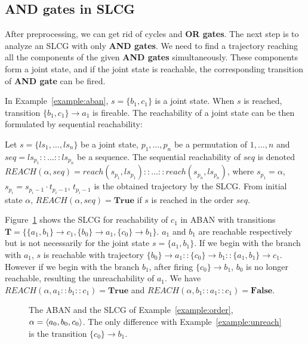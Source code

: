\documentclass[runningheads]{llncs}
\newcommand{\acm}[3]{\{#1\}\rightarrow#3}
\newcommand{\ac}[3]{$\{#1\}\rightarrow#3$}
\DeclarePairedDelimiter{\init}{\langle}{\rangle}
\begin{document}
\subsection{AND gates in SLCG}\label{sectAndGates}
After preprocessing, we can get rid of cycles and \textbf{OR gates}.
The next step is to analyze an SLCG with only \textbf{AND gates}.
We need to find a trajectory reaching all the components of the given \textbf{AND gates} simultaneously.
These components form a joint state, and if the joint state is reachable, the corresponding transition of \textbf{AND gate} can be fired. 

In Example~\ref{example:aban}, $s=\{ b_1,c_1\}$ is a joint state.
When $s$ is reached, transition \ac{b_1,c_1}{a_0}{a_1} is fireable.
The reachability of a joint state can be then formulated by sequential reachability:
\begin{definition}
Let $s=\{ls_1,\ldots,ls_n\}$ be a joint state, $p_1,\ldots ,p_n$ be a permutation of $1,\ldots ,n$ and $seq=ls_{p_1}::\ldots::ls_{p_n}$ be a sequence.
The sequential reachability of $seq$ is denoted %
$REACH(\alpha,seq)=reach(s_{p_1},ls_{p_1})::\ldots::reach(s_{p_n},ls_{p_n})$, where $s_{p_1}=\alpha$, $s_{p_i}=s_{p_i-1}\cdot t_{p_i-1}$, $t_{p_i-1}$ is the obtained trajectory by the SLCG.
From initial state $\alpha$, $REACH(\alpha,seq)=\mathbf{True}$ if $s$ is reached in the order $seq$.
\end{definition}

\begin{example}\label{example:order}
Figure~\ref{fig:5} shows the SLCG for reachability of $c_1$ in ABAN with transitions $\mathbf{T}=\{\acm{a_1,b_1}{c_0}{c_1},\acm{b_0}{a_0}{a_1},\acm{c_0}{b_0}{b_1}\}$.
$a_1$ and $b_1$ are reachable respectively but is not necessarily for the joint state $s=\{a_1,b_1\}$.
If we begin with the branch with $a_1$, $s$ is reachable with trajectory $\acm{b_0}{a_0}{a_1}::\acm{c_0}{b_0}{b_1}::\acm{a_1,b_1}{c_0}{c_1}$. 
However if we begin with the branch $b_1$, after firing $\acm{c_0}{b_0}{b_1}$, $b_0$ is no longer reachable, resulting the unreachability of $a_1$.
We have $REACH(\alpha,a_1::b_1::c_1)=\mathbf{True}$ and $REACH(\alpha,b_1::a_1::c_1)=\mathbf{False}$.
\end{example}
\begin{figure}[ht]
\centering

\caption{The ABAN and the SLCG of Example~\ref{example:order}, $\alpha=\init{ a_0,b_0,c_0}$. 
The only difference with Example~\ref{example:unreach} is the transition \ac{c_0}{b_0}{b_1}.
}
\label{fig:5}
\end{figure}
\end{document}
